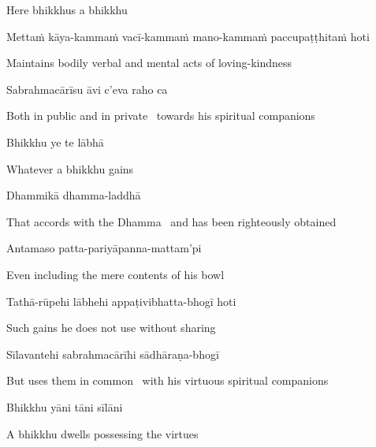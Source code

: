 \begin{english}
  Here bhikkhus a bhikkhu
\end{english}

\begin{pali-hang}
  Mettaṁ kāya-kammaṁ vacī-kammaṁ mano-kammaṁ paccupaṭṭhitaṁ hoti
\end{pali-hang}

\begin{english-hang}
  Maintains bodily verbal and mental acts of loving-kindness
\end{english-hang}

\ifninebythirteenversion\clearpage\fi

Sabrahmacārīsu āvi c'eva raho ca

\begin{english}
  Both in public and in private \breathmark\ towards his spiritual companions
\end{english}

Bhikkhu ye te lābhā

\begin{english}
  Whatever a bhikkhu gains
\end{english}

Dhammikā dhamma-laddhā

\begin{english}
  That accords with the Dhamma \breathmark\ and has been righteously obtained
\end{english}

Antamaso patta-pariyāpanna-mattam'pi

\begin{english}
  Even including the mere contents of his bowl
\end{english}

Tathā-rūpehi lābhehi appaṭivibhatta-bhogī hoti

\begin{english}
  Such gains he does not use without sharing
\end{english}

Sīlavantehi sabrahmacārīhi sādhāraṇa-bhogī

\begin{english}
  But uses them in common \breathmark\ with his virtuous spiritual companions
\end{english}

Bhikkhu yāni tāni sīlāni

\begin{english}
  A bhikkhu dwells possessing the virtues
\end{english}

